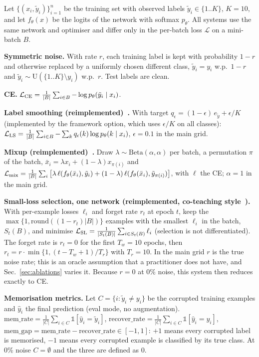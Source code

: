 Let $\{(x_i,\tilde y_i)\}_{i=1}^n$ be the training set with observed labels $\tilde y_i\in\{1..K\}$, $K{=}10$, and let $f_\theta(x)$ be the logits of the network with softmax $p_\theta$. All systems use the same network and optimiser and differ only in the per-batch loss $\mathcal L$ on a mini-batch $B$.

\textbf{Symmetric noise.} With rate $r$, each training label is kept with probability $1-r$ and otherwise replaced by a uniformly chosen different class, $\tilde y_i=y_i$ w.p.\ $1-r$ and $\tilde y_i\sim \mathrm{U}(\{1..K\}\setminus y_i)$ w.p.\ $r$. Test labels are clean.

\textbf{CE.} $\mathcal L_{\rm CE}=\frac1{|B|}\sum_{i\in B}-\log p_\theta(\tilde y_i\mid x_i)$.

\textbf{Label smoothing (reimplemented)~\cite{mller2019when}.} With target $q_\epsilon=(1-\epsilon)\,e_{\tilde y}+\epsilon/K$ (implemented by the framework option, which uses $\epsilon/K$ on all classes): $\mathcal L_{\rm LS}=\frac1{|B|}\sum_{i\in B}-\sum_k q_\epsilon(k)\log p_\theta(k\mid x_i)$, $\epsilon=0.1$ in the main grid.

\textbf{Mixup (reimplemented)~\cite{zhang2017mixup}.} Draw $\lambda\sim\mathrm{Beta}(\alpha,\alpha)$ per batch, a permutation $\pi$ of the batch, $\bar x_i=\lambda x_i+(1-\lambda)x_{\pi(i)}$ and $\mathcal L_{\rm mix}=\frac1{|B|}\sum_i\big[\lambda\,\ell(f_\theta(\bar x_i),\tilde y_i)+(1-\lambda)\,\ell(f_\theta(\bar x_i),\tilde y_{\pi(i)})\big]$, with $\ell$ the CE; $\alpha=1$ in the main grid.

\textbf{Small-loss selection, one network (reimplemented, co-teaching style~\cite{han2018co}).} With per-example losses $\ell_i$ and forget rate $r_t$ at epoch $t$, keep the $\max\{1,\mathrm{round}((1-r_t)|B|)\}$ examples with the smallest $\ell_i$ in the batch, $S_t(B)$, and minimise $\mathcal L_{\rm SL}=\frac1{|S_t(B)|}\sum_{i\in S_t(B)}\ell_i$ (selection is not differentiated). The forget rate is $r_t=0$ for the first $T_w{=}10$ epochs, then $r_t=r\cdot\min\{1,(t-T_w+1)/T_r\}$ with $T_r{=}10$. In the main grid $r$ is the true noise rate; this is an oracle assumption that a practitioner does not have, and Sec.~\ref{sec:ablations} varies it. Because $r{=}0$ at 0\% noise, this system then reduces exactly to CE.

\textbf{Memorisation metrics.} Let $C=\{i:\tilde y_i\ne y_i\}$ be the corrupted training examples and $\hat y_i$ the final prediction (eval mode, no augmentation). $\text{mem\_rate}=\frac1{|C|}\sum_{i\in C}\mathbb 1[\hat y_i=\tilde y_i]$, $\text{recover\_rate}=\frac1{|C|}\sum_{i\in C}\mathbb 1[\hat y_i=y_i]$, $\text{mem\_gap}=\text{mem\_rate}-\text{recover\_rate}\in[-1,1]$: $+1$ means every corrupted label is memorised, $-1$ means every corrupted example is classified by its true class. At 0\% noise $C=\emptyset$ and the three are defined as 0.
